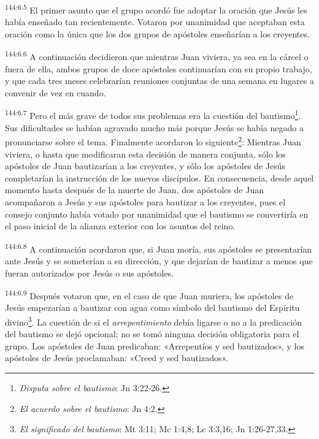 \par 
\textsuperscript{144:6.5} El primer asunto que el grupo acordó fue adoptar la oración que Jesús les había enseñado tan recientemente. Votaron por unanimidad que aceptaban esta oración como la única que los dos grupos de apóstoles enseñarían a los creyentes.

\par 
\textsuperscript{144:6.6} A continuación decidieron que mientras Juan viviera, ya sea en la cárcel o fuera de ella, ambos grupos de doce apóstoles continuarían con su propio trabajo, y que cada tres meses celebrarían reuniones conjuntas de una semana en lugares a convenir de vez en cuando.

\par 
\textsuperscript{144:6.7} Pero el más grave de todos sus problemas era la cuestión del bautismo\footnote{\textit{Disputa sobre el bautismo}: Jn 3:22-26.}. Sus dificultades se habían agravado mucho más porque Jesús se había negado a pronunciarse sobre el tema. Finalmente acordaron lo siguiente\footnote{\textit{El acuerdo sobre el bautismo}: Jn 4:2.}: Mientras Juan viviera, o hasta que modificaran esta decisión de manera conjunta, sólo los apóstoles de Juan bautizarían a los creyentes, y sólo los apóstoles de Jesús completarían la instrucción de los nuevos discípulos. En consecuencia, desde aquel momento hasta después de la muerte de Juan, dos apóstoles de Juan acompañaron a Jesús y sus apóstoles para bautizar a los creyentes, pues el consejo conjunto había votado por unanimidad que el bautismo se convertiría en el paso inicial de la alianza exterior con los asuntos del reino.

\par 
\textsuperscript{144:6.8} A continuación acordaron que, si Juan moría, sus apóstoles se presentarían ante Jesús y se someterían a su dirección, y que dejarían de bautizar a menos que fueran autorizados por Jesús o sus apóstoles.

\par 
\textsuperscript{144:6.9} Después votaron que, en el caso de que Juan muriera, los apóstoles de Jesús empezarían a bautizar con agua como símbolo del bautismo del Espíritu divino\footnote{\textit{El significado del bautismo}: Mt 3:11; Mc 1:4,8; Lc 3:3,16; Jn 1:26-27,33.}. La cuestión de si el \textit{arrepentimiento} debía ligarse o no a la predicación del bautismo se dejó opcional; no se tomó ninguna decisión obligatoria para el grupo. Los apóstoles de Juan predicaban: «Arrepentíos y sed bautizados», y los apóstoles de Jesús proclamaban: «Creed y sed bautizados».


